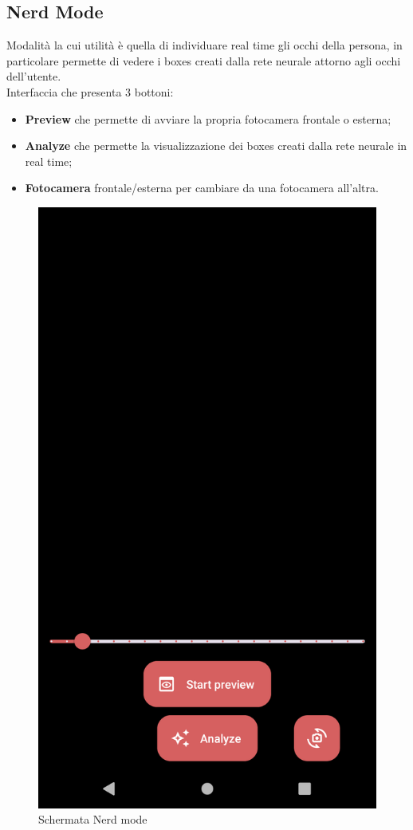 \documentclass[11pt]{article}
\begin{document}
\subsection{Nerd Mode}
Modalità la cui utilità è quella di individuare real time gli occhi della persona, in particolare permette di vedere i boxes creati dalla rete neurale attorno agli occhi dell'utente.
\\Interfaccia che presenta 3 bottoni:
\begin{itemize}
    \item \textbf{Preview} che permette di avviare la propria fotocamera frontale o esterna;
    \item \textbf{Analyze} che permette la visualizzazione dei boxes creati dalla rete neurale in real time;
    \item \textbf{Fotocamera} frontale/esterna per cambiare da una fotocamera all'altra.
\end{itemize}

\begin{figure}[h]
\caption{Schermata Nerd mode }
\centering
\includegraphics[scale=0.17]{img/nerd.png}
\end{figure}
\end{document}
